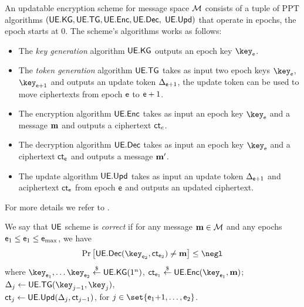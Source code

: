 \documentclass{fundam}
\begin{document}
An updatable encryption scheme for message space $\mathcal{M}$ consists of a tuple of PPT  algorithms $(\mathsf{UE.KG},\mathsf{UE.TG},\mathsf{UE.Enc}, \mathsf{UE.Dec},$ $\mathsf{UE.Upd})$ that operate in epochs, the epoch starts at $0$. The scheme's algorithms works as follows:
\begin{itemize}
	\item The \textit{key generation} algorithm $\mathsf{UE.KG}$ outputs an epoch key $\key_{\epoch}$.
	\item The \textit{token generation} algorithm $\mathsf{UE.TG}$ takes as input two epoch keys $\key_{\epoch}$, $\key_{\epoch+1}$ and outputs an update token $\Delta_{\mathsf{e}+1}$, the update token can be used to move ciphertexts from epoch $\mathsf{e}$ to $\mathsf{e}+1$. 
	\item The encryption algorithm $\mathsf{UE.Enc}$ takes as input an epoch key $\key_{\epoch}$ and a message $\mathbf{m}$ and outputs a ciphertext $\mathsf{ct}_{e}$.
	\item The decryption algorithm $\mathsf{UE.Dec}$ takes as input an epoch key $\key_{\epoch}$ and a ciphertext $\mathsf{ct}_{\mathsf{e}}$ and outputs a message $\mathbf{m}'$.
	\item The update algorithm $\mathsf{UE.Upd}$ takes as input an update token $\Delta_{\mathsf{e}+1}$ and aciphertext $\mathsf{ct}_{\mathsf{e}}$ from epoch $\mathsf{e}$ and outputs an updated ciphertext.
\end{itemize}
For more details we refer to \cite{jiang2020}.

We say that $\mathsf{UE}$ scheme is \textit{correct} if for any message $\mathbf{m}\in\mathcal{M}$ and any epochs $\mathsf{e}_{1}\leq \mathsf{e}_{1} \leq \mathsf{e}_{\max}$, we have
$$\Pr\left[  \uedec(\key_{\epoch_{2}}, \ct_{\epoch_{2}}) \neq \m \right]\leq \negl$$
where $\key_{\epoch_{1}}, \ldots \key_{\epoch_{2}} \sample \uekg(1^{n})$, $\ct_{\epoch_{1}}\sample \ueenc(\key_{\epoch_{1}}, \m)$; $\tok_{j}\gets \uetg(\key_{j-1}, \key_{j})$,\\ $\mathsf{ct}_{j}\gets \mathsf{UE.Upd}(\Delta_{j}, \mathsf{ct}_{j-1})$, for $j\in \set{\epoch_{1}\tx{+}1, \ldots ,\epoch_{2} }$.
\end{document}
